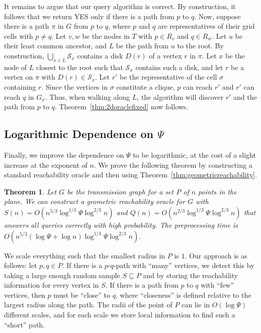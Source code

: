 \documentclass[11pt,a4paper]{paper}
\newtheorem{theorem}{Theorem}[section]
\renewcommand\S{{\mathcal S}}
\begin{document}
It remains to argue that our query algorithm is correct.
By construction, it follows
that we return YES only if there is a path from $p$ to $q$.
Now, suppose there is a path $\pi$ in $G$ from $p$ to $q$,
where $p$ and $q$ are representatives of their grid cells with $p\neq q$.
Let $v, w$ be the nodes in $T$ with
$p \in R_{v}$ and $q \in R_{w}$. Let $u$
be their least common ancestor, and $L$ be the path from $u$
to the root.
By construction, $\bigcup_{x \in L} \S_x$ contains a disk $D(r)$
of a vertex $r$ in $\pi$.
Let $x$ be the node of $L$ closest to the root such that
$\S_x$ contains such a disk, and let $r$ be a vertex on $\pi$ with
$D(r) \in \S_x$.
Let $r'$ be the representative of the cell $\sigma$ containing $r$.
Since the vertices in $\sigma$ constitute a clique,
$p$ can reach $r'$ and $r'$ can reach $q$ in
$G_x$.
Thus, when walking along $L$, the algorithm will discover $r'$ and
the path from $p$ to $q$.
Theorem~\ref{thm:2doraclefixed} now follows.


\subsection{Logarithmic Dependence on $\Psi$}
\label{sec:psipoly}

Finally, we improve the dependence on $\Psi$ to be logarithmic,
at the cost of a slight increase at the exponent of $n$.
We prove the following theorem by constructing a standard reachability oracle and
then using Theorem~\ref{thm:geometricreachability}.
\begin{theorem}
\label{thm:2doraclebounded}
Let $G$ be the transmission graph for a
set $P$ of $n$ points in the plane.
We can construct a geometric reachability oracle for $G$
with $S(n) = O(n^{5/3}\log^{1/3}\Psi \log^{2/3} n)$ and
$Q(n) = O(n^{2/3}\log^{1/3} \Psi \log^{2/3} n)$ that answers all
queries correctly with high probability.
The preprocessing time is
$O(n^{5/3}(\log \Psi + \log n)\log^{1/3} \Psi \log^{2/3}n )$.
\end{theorem}

We scale everything such that the smallest radius in
$P$ is $1$.
Our approach is as follows: let $p,q \in P$.
If there is a $p$-$q$-path  with  ``many'' vertices, we detect
this by taking a large enough
random sample $S \subseteq P$ and by storing the
reachability information for every vertex in $S$.
If there is a path from $p$ to $q$ with ``few'' vertices, then $p$
must be ``close'' to $q$, where ``closeness'' is defined relative to
the largest radius along the path. The radii of the point of $P$ can lie in
$O(\log \Psi)$ different scales, and for each scale we
store local information to find such a ``short'' path.
\end{document}
